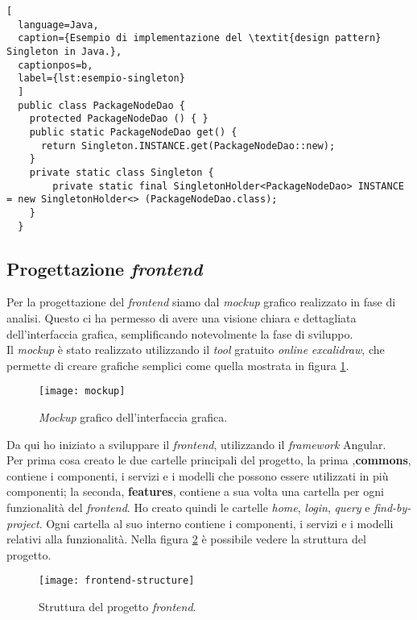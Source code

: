 \begin{lstlisting}[
  language=Java, 
  caption={Esempio di implementazione del \textit{design pattern} Singleton in Java.},
  captionpos=b, 
  label={lst:esempio-singleton}
  ]
  public class PackageNodeDao {
    protected PackageNodeDao () { }
    public static PackageNodeDao get() {
      return Singleton.INSTANCE.get(PackageNodeDao::new);
    }
    private static class Singleton {
        private static final SingletonHolder<PackageNodeDao> INSTANCE = new SingletonHolder<> (PackageNodeDao.class);
    }
  }
\end{lstlisting}

\subsection*{Progettazione \textit{frontend}}

Per la progettazione del \textit{frontend} siamo dal \textit{mockup} grafico realizzato in fase di analisi.
Questo ci ha permesso di avere una visione chiara e dettagliata dell'interfaccia grafica, 
semplificando notevolmente la fase di sviluppo.\\
Il \textit{mockup} è stato realizzato utilizzando il \textit{tool} gratuito \textit{online} \textit{excalidraw}, che permette di creare grafiche semplici
come quella mostrata in figura \ref*{fig:mockup}.\\
\begin{figure}[!h] 
  \centering 
  \texttt{[image: mockup]} 
  \caption{\textit{Mockup} grafico dell'interfaccia grafica.}
  \label{fig:mockup}
\end{figure}

Da qui ho iniziato a sviluppare il \textit{frontend}, utilizzando il \textit{framework} Angular.\\
Per prima cosa creato le due cartelle principali del progetto, la prima ,\textbf{commons}, contiene i componenti, i servizi e i modelli che possono 
essere utilizzati in più componenti;
la seconda, \textbf{features}, contiene a sua volta una cartella per ogni funzionalità del \textit{frontend}.
Ho creato quindi le cartelle \textit{home}, \textit{login}, \textit{query} e \textit{find-by-project}. 
  Ogni cartella al suo interno contiene i componenti, i servizi e i modelli relativi alla funzionalità. 
  Nella figura \ref*{fig:frontend-structure} è possibile vedere la struttura del progetto.
  \begin{figure}[!h] 
    \centering
    \texttt{[image: frontend-structure]} 
    \caption{Struttura del progetto \textit{frontend}.}
    \label{fig:frontend-structure}
  \end{figure}  

